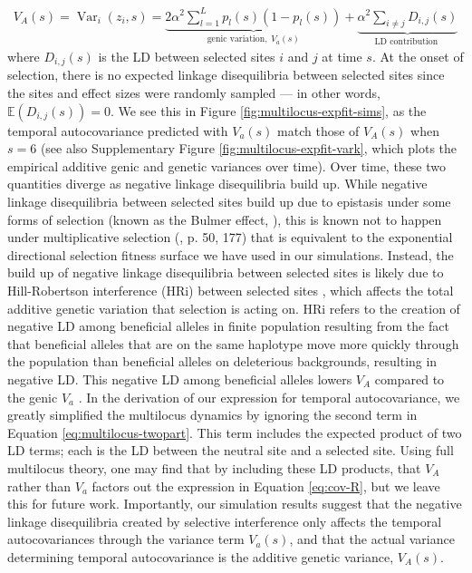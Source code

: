 \documentclass[11pt]{article}
\newcommand{\E}{\mathbb{E}}
\DeclareMathOperator{\var}{Var}
\begin{document}
\begin{align} V_A(s) = \var_i(z_i, s) = \underbrace{2 \alpha^2 \sum_{l=1}^L
p_{l}(s) (1-p_{l}(s))}_{\text{genic variation}, \; V_a(s)} +
\underbrace{\alpha^2 \sum_{i\ne j} D_{i,j}(s)}_\text{LD contribution }
\label{eq:var-genic-z} \end{align}
%
where $D_{i,j}(s)$ is the LD between selected sites $i$ and $j$ at time $s$.
At the onset of selection, there is no expected linkage disequilibria between
selected sites since the sites and effect sizes were randomly sampled --- in
other words, $\E(D_{i,j}(s)) = 0$. We see this in Figure
\ref{fig:multilocus-expfit-sims}, as the temporal autocovariance predicted with
$V_a(s)$ match those of $V_A(s)$ when $s = 6$ (see also Supplementary Figure
\ref{fig:multilocus-expfit-vark}, which plots the empirical additive genic and
genetic variances over time). Over time, these two quantities diverge as
negative linkage disequilibria build up. While negative linkage disequilibria
between selected sites build up due to epistasis under some forms of selection
(known as the Bulmer effect, \cite{Bulmer1971-ae,Bulmer1980-zo}), this is known
not to happen under multiplicative selection (\cite{Burger2000-an}, p. 50, 177)
that is equivalent to the exponential directional selection fitness surface we
have used in our simulations. Instead, the build up of negative linkage
disequilibria between selected sites is likely due to Hill-Robertson
interference (HRi) between selected sites \parencite{Hill1966-kd}, which
affects the total additive genetic variation that selection is acting on. HRi
refers to the creation of negative LD among beneficial alleles in finite
population resulting from the fact that beneficial alleles that are on the same
haplotype move more quickly through the population than beneficial alleles on
deleterious backgrounds, resulting in negative LD.  This negative LD among
beneficial alleles lowers $V_A$ compared to the genic $V_a$
\parencite{Hill1966-kd,Barton2005-zq,Crouch2017-xr,Good2014-yz}. In the
derivation of our expression for temporal autocovariance, we greatly simplified
the multilocus dynamics by ignoring the second term in Equation
\eqref{eq:multilocus-twopart}. This term includes the expected product of two
LD terms; each is the LD between the neutral site and a selected site. Using
full multilocus theory, one may find that by including these LD products, that
$V_A$ rather than $V_a$ factors out the expression in Equation
\eqref{eq:cov-R}, but we leave this for future work. Importantly, our
simulation results suggest that the negative linkage disequilibria created by
selective interference only affects the temporal autocovariances through the
variance term $V_a(s)$, and that the actual variance determining temporal
autocovariance is the additive genetic variance, $V_A(s)$.
\end{document}
